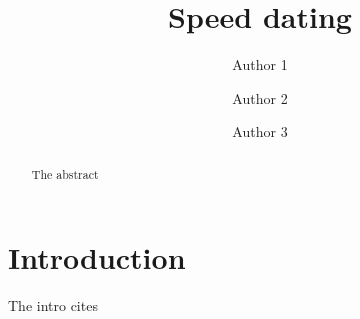 \documentclass{llncs}
\begin{document}
%
\title{Speed dating}
%
%
\author{Author 1 \and Author 2
\and Author 3}
%
%
%


\newcommand\enum{\addtocounter{equation}{1}\tag{\theequation}}

\maketitle              %

\begin{abstract}
The abstract
\end{abstract}

\section {Introduction}

The intro cites \cite{Akerborg2008}



%
\end{document}

